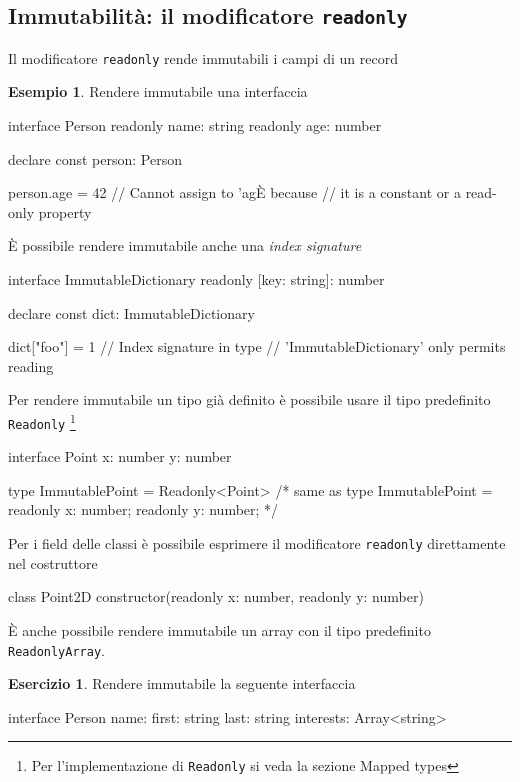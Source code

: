 \documentclass[12pt]{article}
\theoremstyle{definition}
\newtheorem{example}{Esempio}[subsection]
\newtheorem{exercise}{Esercizio}[subsection]
\newenvironment{code}
  {\vspace{0.5cm} \VerbatimEnvironment\begin{typescriptcode}}
  {\end{typescriptcode} \vspace{0.2cm}}
\begin{document}
\subsection{Immutabilità: il modificatore \texttt{readonly}}

Il modificatore \texttt{readonly} rende immutabili i campi di un record

\begin{example}
Rendere immutabile una interfaccia

\begin{code}
interface Person {
  readonly name: string
  readonly age: number
}

declare const person: Person

person.age = 42 // Cannot assign to 'agÈ because
// it is a constant or a read-only property
\end{code}
\end{example}

È possibile rendere immutabile anche una \emph{index signature}

\begin{code}
interface ImmutableDictionary {
  readonly [key: string]: number
}

declare const dict: ImmutableDictionary

dict["foo"] = 1 // Index signature in type
// 'ImmutableDictionary' only permits reading
\end{code}

Per rendere immutabile un tipo già definito è possibile usare il tipo predefinito \texttt{Readonly}
\footnote{Per l'implementazione di \texttt{Readonly} si veda la sezione Mapped types}

\begin{code}
interface Point {
  x: number
  y: number
}

type ImmutablePoint = Readonly<Point>
/* same as
type ImmutablePoint = {
    readonly x: number;
    readonly y: number;
}
*/
\end{code}

Per i field delle classi è possibile esprimere il modificatore \texttt{readonly} direttamente nel costruttore

\begin{code}
class Point2D {
  constructor(readonly x: number, readonly y: number) {}
}
\end{code}

È anche possibile rendere immutabile un array con il tipo predefinito
\texttt{ReadonlyArray}.

\begin{exercise}
Rendere immutabile la seguente interfaccia

\begin{code}
interface Person {
  name: {
    first: string
    last: string
  }
  interests: Array<string>
}
\end{code}
\end{exercise}
\end{document}
